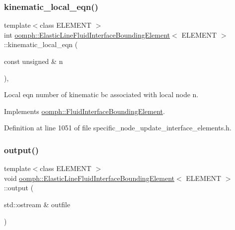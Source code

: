 \subsubsection{\texorpdfstring{kinematic\+\_\+local\+\_\+eqn()}{kinematic\_local\_eqn()}}
{\footnotesize\ttfamily template$<$class E\+L\+E\+M\+E\+NT $>$ \\
int \hyperlink{classoomph_1_1ElasticLineFluidInterfaceBoundingElement}{oomph\+::\+Elastic\+Line\+Fluid\+Interface\+Bounding\+Element}$<$ E\+L\+E\+M\+E\+NT $>$\+::kinematic\+\_\+local\+\_\+eqn (\begin{DoxyParamCaption}\item[{const unsigned \&}]{n }\end{DoxyParamCaption})\hspace{0.3cm}{\ttfamily [inline]}, {\ttfamily [virtual]}}



Local eqn number of kinematic bc associated with local node n. 



Implements \hyperlink{classoomph_1_1FluidInterfaceBoundingElement_a12a0a6d7c3c1c1a5a0f42a57e60eab34}{oomph\+::\+Fluid\+Interface\+Bounding\+Element}.



Definition at line 1051 of file specific\+\_\+node\+\_\+update\+\_\+interface\+\_\+elements.\+h.

\mbox{\label{classoomph_1_1ElasticLineFluidInterfaceBoundingElement_a50444fef924185e8d462238045e24543}} 
\subsubsection{\texorpdfstring{output()}{output()}\hspace{0.1cm}{\footnotesize\ttfamily [1/4]}}
{\footnotesize\ttfamily template$<$class E\+L\+E\+M\+E\+NT $>$ \\
void \hyperlink{classoomph_1_1ElasticLineFluidInterfaceBoundingElement}{oomph\+::\+Elastic\+Line\+Fluid\+Interface\+Bounding\+Element}$<$ E\+L\+E\+M\+E\+NT $>$\+::output (\begin{DoxyParamCaption}\item[{std\+::ostream \&}]{outfile }\end{DoxyParamCaption})\hspace{0.3cm}{\ttfamily [inline]}}



